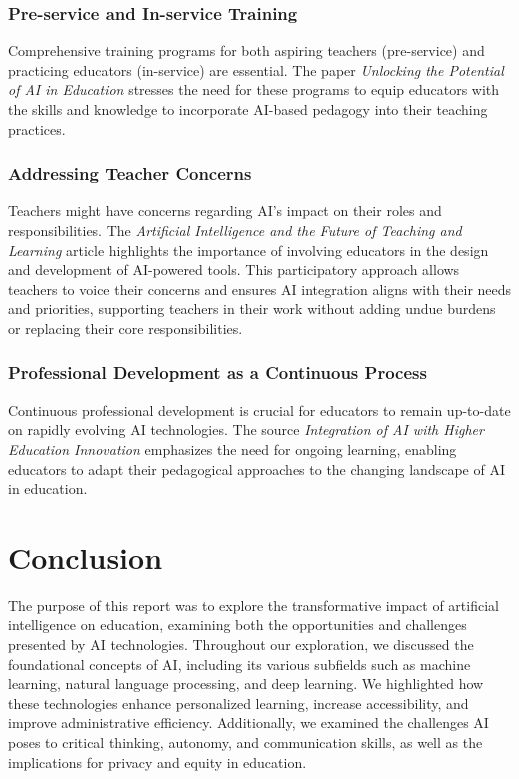 \documentclass{article}
\begin{document}
\subsubsection{Pre-service and In-service Training}

Comprehensive training programs for both aspiring teachers (pre-service) and practicing educators (in-service) are essential. The paper \textit{Unlocking the Potential of AI in Education} \cite{Rashmi2023Unlocking} stresses the need for these programs to equip educators with the skills and knowledge to incorporate AI-based pedagogy into their teaching practices.

\subsubsection{Addressing Teacher Concerns}

Teachers might have concerns regarding AI's impact on their roles and responsibilities. The \textit{Artificial Intelligence and the Future of Teaching and Learning} article highlights the importance of involving educators in the design and development of AI-powered tools. This participatory approach allows teachers to voice their concerns and ensures AI integration aligns with their needs and priorities, supporting teachers in their work without adding undue burdens or replacing their core responsibilities.

\subsubsection{Professional Development as a Continuous Process}

Continuous professional development is crucial for educators to remain up-to-date on rapidly evolving AI technologies. The source \textit{Integration of AI with Higher Education Innovation}\cite{Shi2023IntegrationOA} emphasizes the need for ongoing learning, enabling educators to adapt their pedagogical approaches to the changing landscape of AI in education.






\newpage

\section{Conclusion}
The purpose of this report was to explore the transformative impact of artificial intelligence on education, examining both the opportunities and challenges presented by AI technologies. Throughout our exploration, we discussed the foundational concepts of AI, including its various subfields such as machine learning, natural language processing, and deep learning. We highlighted how these technologies enhance personalized learning, increase accessibility, and improve administrative efficiency. Additionally, we examined the challenges AI poses to critical thinking, autonomy, and communication skills, as well as the implications for privacy and equity in education.
\end{document}
